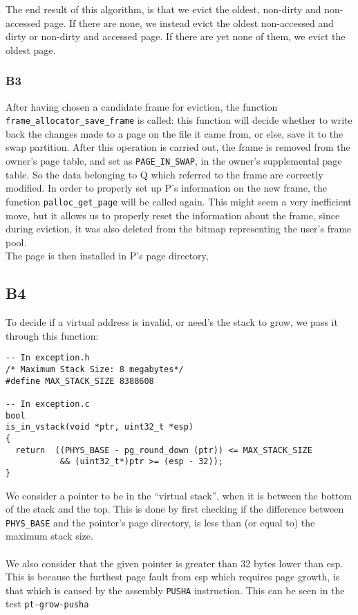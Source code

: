 \documentclass[a4wide, 11pt]{article}
\newcommand{\tx}{\texttt}
\begin{document}
The end result of this algorithm, is that we evict the oldest, non-dirty and non-accessed page. If there are none, we instead evict the oldest non-accessed and dirty or non-dirty and accessed page. If there are yet none of them, we evict the oldest page.

\subsubsection{B3}
After having chosen a candidate frame for eviction, the function \tx{frame\_allocator\_save\_frame} is called: this function will decide whether to write back the changes made to a page on the file it came from, or else, save it to the swap partition. After this operation is carried out, the frame is removed from the owner's page table, and set as \tx{PAGE\_IN\_SWAP}, in the owner's supplemental page table. So the data belonging to Q which referred to the frame are correctly modified.
In order to properly set up P's information on the new frame, the function \tx{palloc\_get\_page} will be called again. This might seem a very inefficient move, but it allows us to properly reset the information about the frame, since during eviction, it was also deleted from the bitmap representing the user's frame pool.\\
The page is then installed in P's page directory,   


\subsection{B4}

To decide if a virtual address is invalid, or need's the stack to grow, we pass it through this function:
\begin{verbatim}
-- In exception.h
/* Maximum Stack Size: 8 megabytes*/
#define MAX_STACK_SIZE 8388608

-- In exception.c
bool
is_in_vstack(void *ptr, uint32_t *esp)
{
  return  ((PHYS_BASE - pg_round_down (ptr)) <= MAX_STACK_SIZE
           && (uint32_t*)ptr >= (esp - 32));
}
\end{verbatim}

We consider a pointer to be in the ``virtual stack'', when it is between the bottom of the stack and the top. This is done by first checking if the difference between \tx{PHYS\_BASE} and the pointer's page directory, is less than (or equal to) the maximum stack size.\\
\\
We also consider that the given pointer is greater than 32 bytes lower than esp. This is because the furthest page fault from esp which requires page growth, is that which is caused by the assembly \tx{PUSHA} instruction. This can be seen in the test \tx{pt-grow-pusha}
\end{document}
